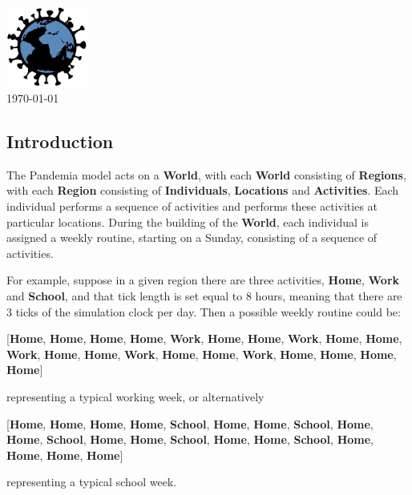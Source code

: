 \documentclass[10pt,letterpaper]{article}
\begin{document}
\vspace*{0.2in}

\begin{centering}
{\huge\textbf{}}
\\
\bigskip
\includegraphics[width=0.2\textwidth]{pandemia_logo}
\\
\bigskip
\today
\\
\end{centering}

\subsection*{Introduction}

The Pandemia model acts on a \textbf{World}, with each \textbf{World} consisting of \textbf{Regions}, with each \textbf{Region} consisting of \textbf{Individuals}, \textbf{Locations} and \textbf{Activities}. Each individual performs a sequence of activities and performs these activities at particular locations. During the building of the \textbf{World}, each individual is assigned a weekly routine, starting on a Sunday, consisting of a sequence of activities.

For example, suppose in a given region there are three activities, \textbf{Home}, \textbf{Work} and \textbf{School}, and that tick length is set equal to 8 hours, meaning that there are 3 ticks of the simulation clock per day. Then a possible weekly routine could be:
\begin{center}
[\textbf{Home}, \textbf{Home}, \textbf{Home}, \textbf{Home}, \textbf{Work}, \textbf{Home}, \textbf{Home}, \textbf{Work}, \textbf{Home}, \textbf{Home}, \textbf{Work}, \textbf{Home}, \textbf{Home}, \textbf{Work}, \textbf{Home}, \textbf{Home}, \textbf{Work}, \textbf{Home}, \textbf{Home}, \textbf{Home}, \textbf{Home}]
\end{center}
representing a typical working week, or alternatively 
\begin{center}
[\textbf{Home}, \textbf{Home}, \textbf{Home}, \textbf{Home}, \textbf{School}, \textbf{Home}, \textbf{Home}, \textbf{School}, \textbf{Home}, \textbf{Home}, \textbf{School}, \textbf{Home}, \textbf{Home}, \textbf{School}, \textbf{Home}, \textbf{Home}, \textbf{School}, \textbf{Home}, \textbf{Home}, \textbf{Home}, \textbf{Home}]
\end{center}
representing a typical school week.
\end{document}
